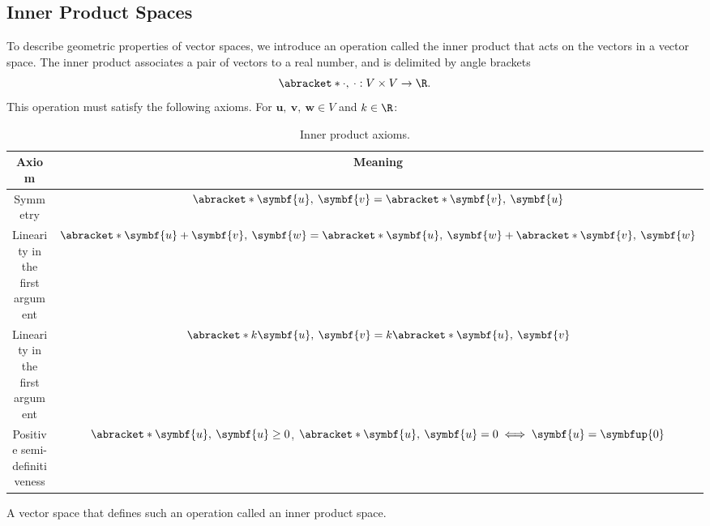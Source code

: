 \documentclass{article}
\begin{document}
\subsection{Inner Product Spaces}
To describe geometric properties of vector spaces, we introduce an
operation called the inner product that acts on the vectors in a vector
space. The inner product associates a pair of vectors to a real number,
and is delimited by angle brackets
\begin{equation*}
    \abracket*{\cdot,\: \cdot} : V \times V \to \R.
\end{equation*}
This operation must satisfy the following axioms. For \(\symbf{u},\: \symbf{v},\: \symbf{w} \in V\)
and \(k \in \R\):
\begin{table}[H]
    \centering
    \begin{tabular}{c c}
        \toprule
        \textbf{Axiom}                  & \textbf{Meaning}                                                                                                             \\
        \midrule
        Symmetry                        & \(\abracket*{\symbf{u},\: \symbf{v}} = \abracket*{\symbf{v},\: \symbf{u}}\)                                                  \\
        Linearity in the first argument & \(\abracket*{\symbf{u} + \symbf{v},\: \symbf{w}} = \abracket*{\symbf{u},\: \symbf{w}} + \abracket*{\symbf{v},\: \symbf{w}}\) \\
        Linearity in the first argument & \(\abracket*{k \symbf{u},\: \symbf{v}} = k\abracket*{\symbf{u},\: \symbf{v}}\)                                               \\
        Positive semi-definitiveness    & \(\abracket*{\symbf{u},\: \symbf{u}} \geq 0\), \(\abracket*{\symbf{u},\: \symbf{u}} = 0 \iff \symbf{u} = \symbfup{0}\)       \\
        \bottomrule
    \end{tabular}
    \caption{Inner product axioms.} %
\end{table}
A vector space that defines such an operation called an inner product space.
\end{document}
